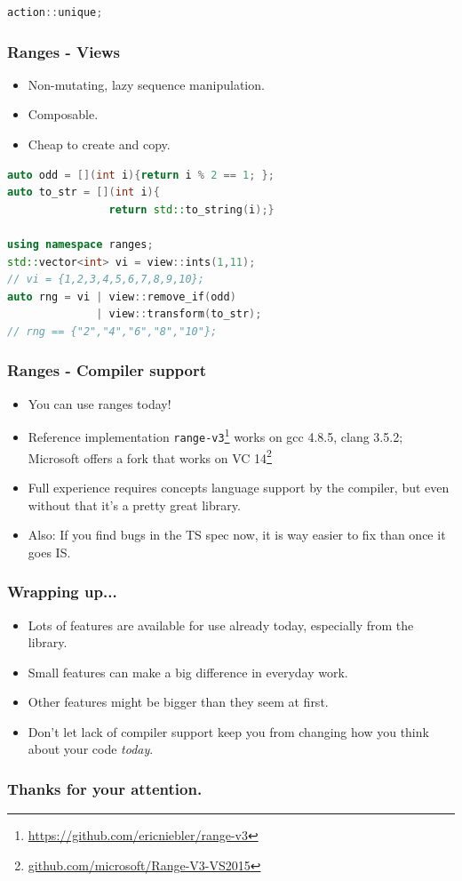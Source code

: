 \documentclass{beamer}
\begin{document}
\begin{frame}[fragile]
\begin{lstlisting}[language=C++,basicstyle=\ttfamily,keywordstyle=\color{blue},showstringspaces=false]
action::unique;
    \end{lstlisting}
\end{frame}

\begin{frame}[fragile]
    \frametitle{Ranges - Views}
    \begin{itemize}
        \item Non-mutating, lazy sequence manipulation.
        \item Composable.
        \item Cheap to create and copy.
    \end{itemize}
    \begin{lstlisting}[language=C++,basicstyle=\ttfamily,keywordstyle=\color{blue},showstringspaces=false]
auto odd = [](int i){return i % 2 == 1; };
auto to_str = [](int i){
                return std::to_string(i);}

using namespace ranges;
std::vector<int> vi = view::ints(1,11);
// vi = {1,2,3,4,5,6,7,8,9,10};
auto rng = vi | view::remove_if(odd)
              | view::transform(to_str);
// rng == {"2","4","6","8","10"};
    \end{lstlisting}
\end{frame}

\begin{frame}
    \frametitle{Ranges - Compiler support}
    \begin{itemize}
        \item You can use ranges today!
        \item Reference implementation \texttt{range-v3}\footnote{\url{https://github.com/ericniebler/range-v3}} works on gcc 4.8.5, clang 3.5.2; Microsoft offers a fork that works on VC 14\footnote{\url{github.com/microsoft/Range-V3-VS2015}}
        \item Full experience requires concepts language support by the compiler, but even without that it's a pretty great library.
        \item Also: If you find bugs in the TS spec now, it is way easier to fix than once it goes IS.
    \end{itemize}
\end{frame}


\begin{frame}
    \frametitle{Wrapping up...}
    \begin{itemize}
        \item Lots of features are available for use already today, especially from the library.
        \item Small features can make a big difference in everyday work.
        \item Other features might be bigger than they seem at first.
        \item Don't let lack of compiler support keep you from changing how you think about your code \emph{today}.
    \end{itemize}
\end{frame}

\fi

\begin{frame}
  \frametitle{Thanks for your attention.}
\end{frame}
\end{document}
